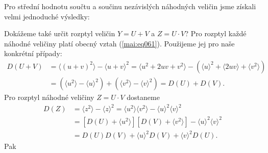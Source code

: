       
      
      Pro střední hodnotu součtu a součinu nezávislých náhodných veličin jsme získali velmi
      jednoduché výsledky:
      
      
      Dokážeme také určit rozptyl veličin \(Y = U + V\) a \(Z = U\cdot V\)? Pro rozptyl každé 
      náhodné veličiny platí obecný vztah (\ref{mai:eq061}). Použijeme jej pro naše konkrétní 
      případy:
      \begin{align*}
        D(U + V) &= \langle (u + v)^2 \rangle - \langle u + v \rangle^2 
                  = \langle u^2 + 2uv + v^2 \rangle - \left(\langle u \rangle^2 +
                    \langle 2uv \rangle + \langle v^2 \rangle\right)                        \\
                 &= \left(\langle u^2\rangle - \langle u \rangle^2\right)
                  + \left(\langle v^2\rangle - \langle v \rangle^2\right) = D(U) + D(V).
      \end{align*}
      Pro rozptyl náhodné veličiny \(Z = U \cdot V\) dostaneme
      \begin{align*}
        D(Z)  &= \langle z^2\rangle - \langle z \rangle^2 
               = \langle u^2\rangle\langle v^2\rangle - \langle u \rangle^2 \langle v \rangle^2  \\
              &= \left[D(U) + \langle u^2\rangle\right]\left[D(V) + \langle v^2\rangle\right]
               - \langle u \rangle^2 \langle v \rangle^2                                         \\
              &= D(U)D(V) + \langle u \rangle^2D(V) + \langle v \rangle^2D(U).
      \end{align*}
      Pak
